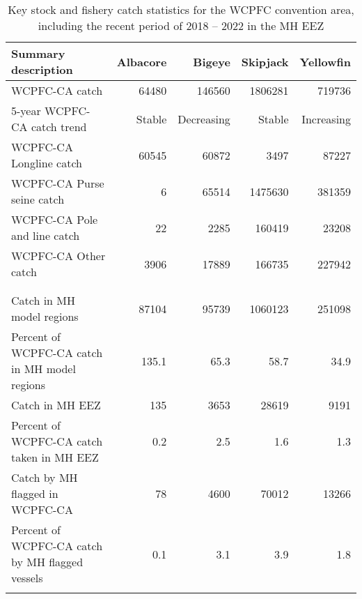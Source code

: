 \begin{longtable}{lrrrr}
\caption{Key stock and fishery catch statistics for the WCPFC convention area, including the recent period of 2018 -- 2022 in the MH EEZ} \\ 
  \hline
Summary description & Albacore & Bigeye & Skipjack & Yellowfin \\ 
  \hline
WCPFC-CA catch & 64480 & 146560 & 1806281 & 719736 \\ 
  5-year WCPFC-CA catch trend & Stable & Decreasing & Stable & Increasing \\ 
  WCPFC-CA Longline catch & 60545 & 60872 & 3497 & 87227 \\ 
  WCPFC-CA Purse seine catch & 6 & 65514 & 1475630 & 381359 \\ 
  WCPFC-CA Pole and line catch & 22 & 2285 & 160419 & 23208 \\ 
  WCPFC-CA Other catch & 3906 & 17889 & 166735 & 227942 \\ 
   &  &  &  &  \\ 
   \hline
 &  &  &  &  \\ 
  Catch in MH model regions & 87104 & 95739 & 1060123 & 251098 \\ 
  Percent of WCPFC-CA catch in MH model regions & 135.1 & 65.3 & 58.7 & 34.9 \\ 
  Catch in MH EEZ & 135 & 3653 & 28619 & 9191 \\ 
  Percent of WCPFC-CA catch taken in MH EEZ & 0.2 & 2.5 & 1.6 & 1.3 \\ 
  Catch by MH flagged in WCPFC-CA & 78 & 4600 & 70012 & 13266 \\ 
  Percent of WCPFC-CA catch by MH flagged vessels & 0.1 & 3.1 & 3.9 & 1.8 \\ 
  \hline
\label{cat_sum_tab}
\end{longtable}
